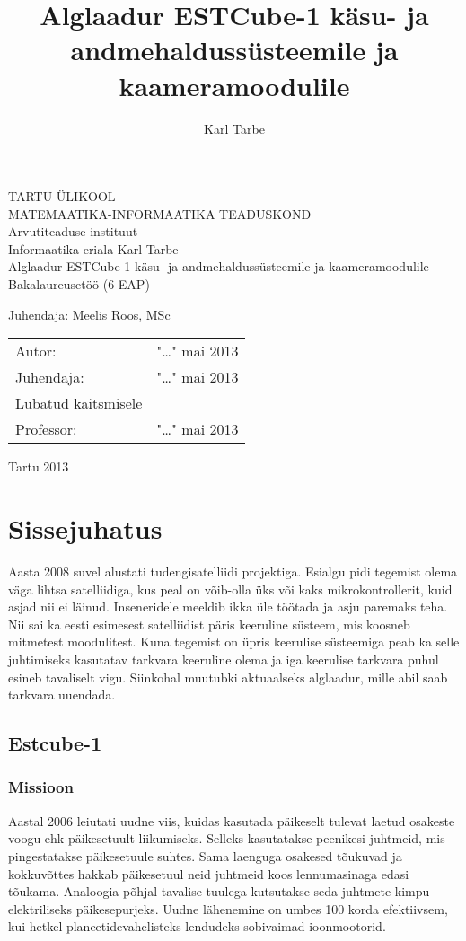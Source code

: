 \documentclass[12pt,a4paper]{article}
\title{Alglaadur ESTCube-1 käsu- ja andmehaldussüsteemile ja kaameramoodulile}
\author{Karl Tarbe}
\begin{document}
\begin{titlepage}
\begin{center}
	{\large TARTU ÜLIKOOL\\
MATEMAATIKA-INFORMAATIKA TEADUSKOND\\
Arvutiteaduse instituut\\
Informaatika eriala}
\vskip4cm
{\large Karl Tarbe}\\[6mm]
{\huge Alglaadur ESTCube-1 käsu- ja andmehaldussüsteemile ja kaameramoodulile}\\[4mm]
{\large Bakalaureusetöö (6 EAP)}
\end{center}
\vspace{2cm}
\begin{flushright}
	\large
	Juhendaja: Meelis Roos, MSc
\end{flushright}
\vspace{2cm}
\begin{tabular}{l p{8cm} r}
	Autor: & \dotfill & "\dots" mai 2013\\
	Juhendaja: & \dotfill & "\dots" mai 2013\\[6mm]
	\multicolumn{2}{l}{Lubatud kaitsmisele}\\
	Professor: & \dotfill & "\dots" mai 2013\\
\end{tabular}
\vfill
\centerline{Tartu 2013}
\end{titlepage}
\setcounter{page}{2}
\tableofcontents

\section{Sissejuhatus}
Aasta 2008 suvel alustati tudengisatelliidi projektiga. Esialgu pidi tegemist
olema väga lihtsa satelliidiga, kus peal on võib-olla üks või kaks
mikrokontrollerit, kuid asjad nii ei läinud. Inseneridele meeldib ikka üle
töötada ja asju paremaks teha. Nii sai ka eesti esimesest satelliidist päris
keeruline süsteem, mis koosneb mitmetest moodulitest. Kuna tegemist on üpris
keerulise süsteemiga peab ka selle juhtimiseks kasutatav tarkvara keeruline
olema ja iga keerulise tarkvara puhul esineb tavaliselt vigu. Siinkohal muutubki
aktuaalseks alglaadur, mille abil saab tarkvara uuendada.

\subsection{Estcube-1}
\subsubsection{Missioon}
Aastal 2006 leiutati uudne viis, kuidas kasutada päikeselt tulevat laetud
osakeste voogu ehk päikesetuult liikumiseks. Selleks kasutatakse peenikesi
juhtmeid, mis pingestatakse päikesetuule suhtes. Sama laenguga osakesed tõukuvad
ja kokkuvõttes hakkab päikesetuul neid juhtmeid koos lennumasinaga edasi
tõukama. Analoogia põhjal tavalise tuulega kutsutakse seda juhtmete kimpu
elektriliseks päikesepurjeks. Uudne lähenemine on umbes 100 korda efektiivsem,
kui hetkel planeetidevahelisteks lendudeks sobivaimad ioonmootorid.
\cite{errpuri}
\end{document}
